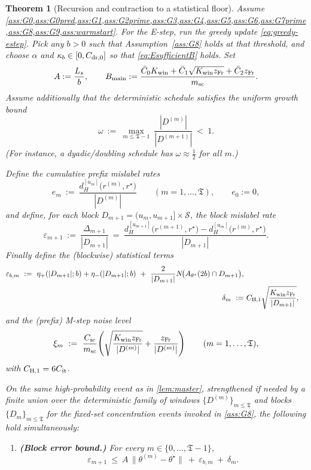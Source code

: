 \documentclass{statsoc}
\newtheorem{theorem}{Theorem}[section]
\newcommand{\1}{\mathbbm{1}}
\newcommand{\Tmax}{\mathfrak{T}}
\begin{document}
\begin{theorem}[Recursion and contraction to a statistical floor]\label{thm:contract}
Assume \cref{ass:G0,ass:G0pred,ass:G1,ass:G2prime,ass:G3,ass:G4,ass:G5,ass:G6,ass:G7prime,ass:G8,ass:G9,ass:warmstart}. 
For the E-step, run the greedy update \eqref{eq:greedy-estep}. Pick any \(b>0\) such that Assumption~\ref{ass:G8} holds at that threshold, and choose \(\alpha\) and \(\kappa_b\in[0,C_{\rm dr,0}]\) so that \eqref{eq:EsufficientB} holds.
Set
\[
A:=\frac{L_s}{b},\qquad B_{\rm main}:=\frac{\bar C_0 K_{\rm win}+\bar C_1\sqrt{K_{\rm win} z_{\rm Fr}}+\bar C_2 z_{\rm Fr}}{m_{\rm sc}}.
\]
Assume additionally that the deterministic schedule satisfies the uniform growth bound
\begin{equation}\label{eq:block-omega}
\omega\ :=\ \max_{m\le \Tmax-1}\ \frac{|D^{(m)}|}{|D^{(m+1)}|}\ <\ 1.
\end{equation}
(For instance, a dyadic/doubling schedule has $\omega\approx\tfrac12$ for all $m$.)

Define the cumulative prefix mislabel rates
\[
e_m\ :=\ \frac{d_H^{[u_m]}\!\big(r^{(m)},r^\star\big)}{|D^{(m)}|}\qquad(m=1,\dots,\Tmax),
\qquad e_0:=0,
\]
and define, for each block $D_{m+1}=(u_m,u_{m+1}]\times\mathcal S$, the block mislabel rate
\[
\varepsilon_{m+1}\ :=\ \frac{\Delta_{m+1}}{|D_{m+1}|}
\ =\ \frac{d_H^{[u_{m+1}]}\!\big(r^{(m+1)},r^\star\big)-d_H^{[u_m]}\!\big(r^{(m)},r^\star\big)}{|D_{m+1}|}.
\]
Finally define the (blockwise) statistical terms
\begin{align*}
\varepsilon_{b,m}\ :=\ \eta_+(|D_{m+1}|;b)+\eta_-(|D_{m+1}|;b)\ +\ \frac{2}{|D_{m+1}|}N\!\big(A_{\theta^\star}(2b)\cap D_{m+1}\big),\\
\delta_{m}\ :=&\ C_{\rm H,1}\sqrt{\frac{K_{\rm win} z_{\rm Fr}}{|D_{m+1}|}},
\end{align*}
and the (prefix) M-step noise level
\[
\xi_m\ :=\ \frac{C_{\rm sc}}{m_{\rm sc}}\!\left(\sqrt{\frac{K_{\rm win} z_{\rm Fr}}{|D^{(m)}|}} + \frac{z_{\rm Fr}}{|D^{(m)}|}\right)
\qquad(m=1,\dots,\Tmax),
\]
with $C_{\rm H,1}=6C_{\rm it}$.

On the same high-probability event as in \cref{lem:master}, strengthened if needed by a finite union over the
deterministic family of windows $\{D^{(m)}\}_{m\le\Tmax}$ and blocks $\{D_m\}_{m\le\Tmax}$ for the fixed-set concentration
events invoked in \cref{ass:G8}, the following hold simultaneously:
\begin{enumerate}[nosep,label=(\roman*)]
\item \textbf{(Block error bound.)} For every $m\in\{0,\dots,\Tmax-1\}$,
\begin{equation}\label{eq:block-mislabel-rate}
\varepsilon_{m+1}\ \le\ A\,\|\theta^{(m)}-\theta^\star\|\ +\ \varepsilon_{b,m}\ +\ \delta_m.
\end{equation}


\end{enumerate}
\end{theorem}
\end{document}
